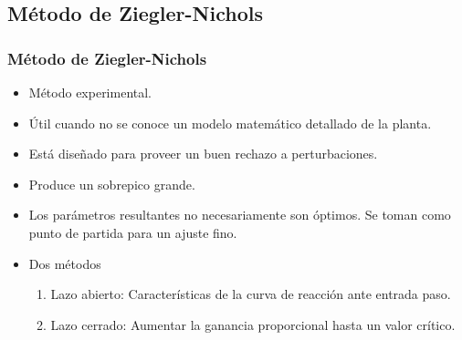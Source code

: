 \documentclass[aspectratio=169]{beamer}
\theoremstyle{definition}
\theoremstyle{plain}
\theoremstyle{remark}
\begin{document}
\subsection{Método de Ziegler-Nichols}
\begin{frame}[<+->]\frametitle{Método de Ziegler-Nichols}
\begin{itemize}
	\item Método experimental.
	\item Útil cuando no se conoce un modelo matemático detallado de la planta.
	\item Está diseñado para proveer un buen rechazo a perturbaciones.
	\item Produce un sobrepico grande.
	\item Los parámetros resultantes no necesariamente son óptimos. Se toman como punto de partida para un ajuste fino.
	\item Dos métodos
	\begin{enumerate}
		\item Lazo abierto: Características de la curva de reacción ante entrada paso.
		\item Lazo cerrado: Aumentar la ganancia proporcional hasta un valor crítico.
	\end{enumerate}
\end{itemize}
\end{frame}
\end{document}
